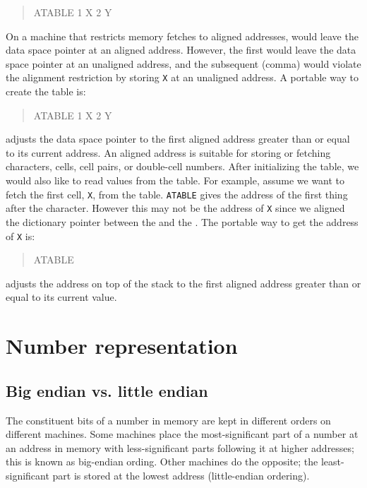 \begin{quote}\ttfamily
	 ATABLE 1  X \word{,} 2  Y \word{,}
\end{quote}

On a machine that restricts memory fetches to aligned addresses,
 would leave the data space pointer at an aligned address.
However, the first  would leave the data space pointer at an
unaligned address,  and the subsequent \word{,} (comma) would violate
the alignment restriction by storing \texttt{X} at an unaligned address.
A portable way to create the table is:

\begin{quote}\ttfamily
	 ATABLE 1 
		 X \word{,} 2   Y \word{,}
\end{quote}

 adjusts the data space pointer to the first aligned
address greater than or equal to its current address. An aligned
address is suitable for storing or fetching characters, cells, cell
pairs, or double-cell numbers.
%
After initializing the table, we would also like to read values from
the table. For example, assume we want to fetch the first cell,
\texttt{X}, from the table. \texttt{ATABLE}  gives the
address of the first thing after the character. However this may not
be the address of \texttt{X} since we aligned the dictionary pointer
between the  and the \word{,}. The portable way to get the
address of \texttt{X} is:
\begin{quote}\ttfamily
	ATABLE  
\end{quote}
 adjusts the address on top of the stack to the first
aligned address greater than or equal to its current value.


\section{Number representation} %

\subsection{Big endian vs. little endian} %
\label{port:endian}

The constituent bits of a number in memory are kept in different
orders on different machines. Some machines place the most-significant
part of a number at an address in memory with less-significant parts
following it at higher addresses; this is known as big-endian
ording. Other machines do the opposite; the
least-significant part is stored at the lowest address (little-endian
ordering).

